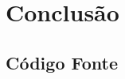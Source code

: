 \documentclass[mestrado, pre-defesa]{packages/icmc}
\begin{document}
\chapter{Conclusão}
\label{chapter:10_conclusion}


% 

\postextual





\glsaddall
\printglossaries


\begin{apendicesenv}

\chapter{Código Fonte}
\label{chapter:source_code}


\end{apendicesenv}




%    

\end{document}
